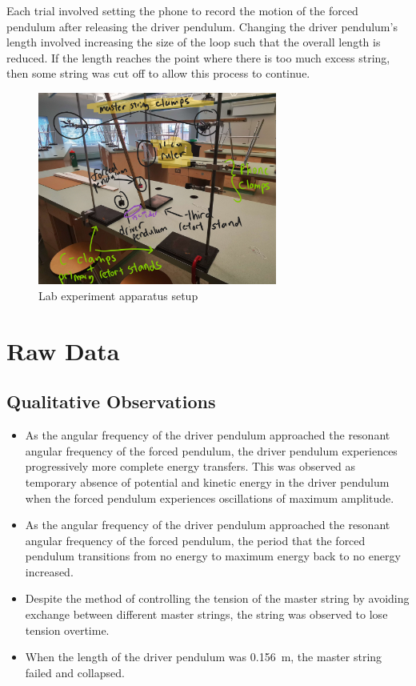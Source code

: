 \documentclass[letterpaper, 12pt]{article}
\begin{document}
Each trial involved setting the phone
to record the motion of the forced
pendulum after releasing the driver
pendulum. Changing the driver pendulum's
length involved increasing the size of the loop
such that the overall length is reduced.
If the length reaches the point where
there is too much excess string, then
some string was cut off to allow this process
to continue.

\begin{figure}[H]
    \centering
    \includegraphics[width=0.7\textwidth]{entireSetup.jpg}
    \caption{Lab experiment apparatus setup}
    \label{fig:entireSetup}
\end{figure}


\section{Raw Data}

\subsection{Qualitative Observations}

\begin{itemize}
    \item As the angular frequency of the driver pendulum approached the resonant angular frequency of the forced pendulum, the driver pendulum experiences progressively more complete energy transfers. This was observed as temporary absence of potential and kinetic energy in the driver pendulum when the forced pendulum experiences oscillations of maximum amplitude.
    \item As the angular frequency of the driver pendulum approached the resonant angular frequency of the forced pendulum, the period that the forced pendulum transitions from no energy to maximum energy back to no energy increased.
    \item Despite the method of controlling the tension of the master string by avoiding exchange between different master strings, the string was observed to lose tension overtime.
    \item When the length of the driver pendulum was \SI{0.156}{m}, the master string failed and collapsed.
\end{itemize}
\end{document}
